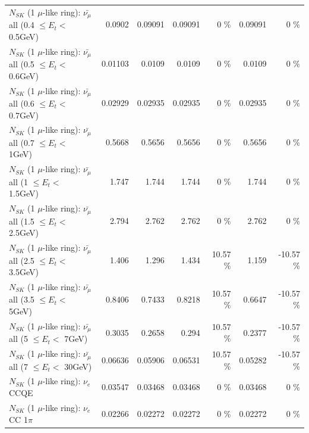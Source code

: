 \begin{table}
\begin{tabular}{| l | r | r | r  r | r  r |}
 $N_{SK}$ (1 $\mu$-like ring): $\bar{\nu_{\mu}}$ all (0.4 $\leq E_{t} <$ 0.5GeV) &          0.0902 &         0.09091 &         0.09091 &        0 \%  &         0.09091 &        0 \%  \\ 
 $N_{SK}$ (1 $\mu$-like ring): $\bar{\nu_{\mu}}$ all (0.5 $\leq E_{t} <$ 0.6GeV) &         0.01103 &          0.0109 &          0.0109 &        0 \%  &          0.0109 &        0 \%  \\ 
 $N_{SK}$ (1 $\mu$-like ring): $\bar{\nu_{\mu}}$ all (0.6 $\leq E_{t} <$ 0.7GeV) &         0.02929 &         0.02935 &         0.02935 &        0 \%  &         0.02935 &        0 \%  \\ 
   $N_{SK}$ (1 $\mu$-like ring): $\bar{\nu_{\mu}}$ all (0.7 $\leq E_{t} <$ 1GeV) &          0.5668 &          0.5656 &          0.5656 &        0 \%  &          0.5656 &        0 \%  \\ 
   $N_{SK}$ (1 $\mu$-like ring): $\bar{\nu_{\mu}}$ all (1 $\leq E_{t} <$ 1.5GeV) &           1.747 &           1.744 &           1.744 &        0 \%  &           1.744 &        0 \%  \\ 
 $N_{SK}$ (1 $\mu$-like ring): $\bar{\nu_{\mu}}$ all (1.5 $\leq E_{t} <$ 2.5GeV) &           2.794 &           2.762 &           2.762 &        0 \%  &           2.762 &        0 \%  \\ 
 $N_{SK}$ (1 $\mu$-like ring): $\bar{\nu_{\mu}}$ all (2.5 $\leq E_{t} <$ 3.5GeV) &           1.406 &           1.296 &           1.434 &    10.57 \%  &           1.159 &   -10.57 \%  \\ 
   $N_{SK}$ (1 $\mu$-like ring): $\bar{\nu_{\mu}}$ all (3.5 $\leq E_{t} <$ 5GeV) &          0.8406 &          0.7433 &          0.8218 &    10.57 \%  &          0.6647 &   -10.57 \%  \\ 
     $N_{SK}$ (1 $\mu$-like ring): $\bar{\nu_{\mu}}$ all (5 $\leq E_{t} <$ 7GeV) &          0.3035 &          0.2658 &           0.294 &    10.57 \%  &          0.2377 &   -10.57 \%  \\ 
    $N_{SK}$ (1 $\mu$-like ring): $\bar{\nu_{\mu}}$ all (7 $\leq E_{t} <$ 30GeV) &         0.06636 &         0.05906 &         0.06531 &    10.57 \%  &         0.05282 &   -10.57 \%  \\ 
\hline
\hline
\hline
                                      $N_{SK}$ (1 $\mu$-like ring): $\nu_e$ CCQE &         0.03547 &         0.03468 &         0.03468 &        0 \%  &         0.03468 &        0 \%  \\ 
                                 $N_{SK}$ (1 $\mu$-like ring): $\nu_e$ CC 1$\pi$ &         0.02266 &         0.02272 &         0.02272 &        0 \%  &         0.02272 &        0 \%  \\ 

\end{tabular}
\end{table}
